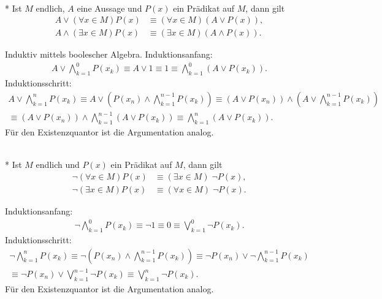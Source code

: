 \newpage
\begin{Satz}[Distributivgesetze]\mbox{}\\*
Ist $M$ endlich, $A$ eine Aussage und $P(x)$ ein Prädikat auf $M$,
dann gilt
\begin{align*}
A\lor(\forall x\in M)P(x) &\equiv (\forall x\in M)(A\lor P(x)),\\
A\land(\exists x\in M)P(x) &\equiv (\exists x\in M)(A\land P(x)).
\end{align*}
\end{Satz}
 Induktiv mittels boolescher Algebra. Induktionsanfang:
\begin{gather*}
A\lor\bigwedge_{k=1}^0 P(x_k) \equiv A\lor 1 \equiv 1 \equiv \bigwedge_{k=1}^0 (A\lor P(x_k)).
\end{gather*}
Induktionsschritt:
\begin{gather*}
A\lor\bigwedge_{k=1}^n P(x_k) \equiv
A\lor (P(x_n)\land\bigwedge_{k=1}^{n-1} P(x_k))
\equiv (A\lor P(x_n))\land (A\lor\bigwedge_{k=1}^{n-1} P(x_k))\\
\equiv (A\lor P(x_n))\land \bigwedge_{k=1}^{n-1} (A\lor P(x_k))
\equiv \bigwedge_{k=1}^n (A\lor P(x_k)).
\end{gather*}
Für den Existenzquantor ist die Argumentation analog.\;\qedsymbol

\begin{Satz}\mbox{}\\*
Ist $M$ endlich und $P(x)$ ein Prädikat auf $M$, dann gilt
\begin{align*}
\neg(\forall x\in M)P(x) &\equiv (\exists x\in M)\;\neg P(x),\\
\neg(\exists x\in M)P(x) &\equiv (\forall x\in M)\;\neg P(x).
\end{align*}
\end{Satz}
 Induktionsanfang:
\begin{gather*}
\neg\bigwedge_{k=1}^0 P(x_k) \equiv \neg 1 \equiv 0 \equiv\bigvee_{k=1}^0 \neg P(x_k).
\end{gather*}
Induktionsschritt:
\begin{gather*}
\neg\bigwedge_{k=1}^n P(x_k)
\equiv \neg(P(x_n)\land\bigwedge_{k=1}^{n-1} P(x_k))
\equiv \neg P(x_n)\lor\neg\bigwedge_{k=1}^{n-1} P(x_k)\\
\equiv \neg P(x_n)\lor\bigvee_{k=1}^{n-1} \neg P(x_k)
\equiv \bigvee_{k=1}^n \neg P(x_k).
\end{gather*}
Für den Existenzquantor ist die Argumentation analog.\;\qedsymbol

